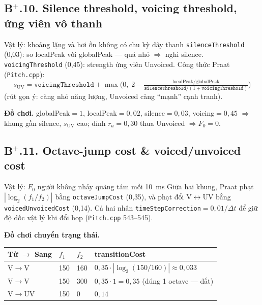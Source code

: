 \subsection*{B$^+$.10. Silence threshold, voicing threshold, ứng viên vô thanh}

\begin{firstprin}{Vật lý: khoảng lặng và hơi ồn không có chu kỳ dây thanh}
\texttt{silenceThreshold} (0{,}03): so localPeak với globalPeak --- quá nhỏ $\Rightarrow$ nghi silence. \texttt{voicingThreshold} (0{,}45): strength ứng viên Unvoiced. Công thức Praat (\texttt{Pitch.cpp}):
\[
s_{\mathrm{UV}} = \texttt{voicingThreshold} + \max\bigl(0,\; 2 - \tfrac{\mathrm{localPeak}/\mathrm{globalPeak}}{\texttt{silenceThreshold}/(1+\texttt{voicingThreshold})}\bigr)
\]
(rút gọn ý: càng nhỏ năng lượng, Unvoiced càng ``mạnh'' cạnh tranh).
\end{firstprin}

\noindent\textbf{Đồ chơi.} globalPeak$=1$, localPeak$=0{,}02$, silence$=0{,}03$, voicing$=0{,}45$ $\Rightarrow$ khung gần silence, $s_{\mathrm{UV}}$ cao; đỉnh $r_a=0{,}30$ thua Unvoiced $\Rightarrow F_0=0$.

\subsection*{B$^+$.11. Octave-jump cost \& voiced/unvoiced cost}

\begin{firstprin}{Vật lý: $F_0$ người không nhảy quãng tám mỗi 10~ms}
Giữa hai khung, Praat phạt $|\log_2(f_1/f_2)|$ bằng \texttt{octaveJumpCost} (0{,}35), và phạt đổi V$\leftrightarrow$UV bằng \texttt{voicedUnvoicedCost} (0{,}14). Cả hai nhân \texttt{timeStepCorrection}$=0{,}01/\Delta t$ để giữ độ dốc vật lý khi đổi hop (\texttt{Pitch.cpp} 543--545).
\end{firstprin}

\noindent\textbf{Đồ chơi chuyển trạng thái.}
\begin{center}\small
\begin{tabular}{@{}llll@{}}
\toprule
Từ $\to$ Sang & $f_1$ & $f_2$ & transitionCost \\
\midrule
V$\to$V & 150 & 160 & $0{,}35\cdot|\log_2(150/160)|\approx0{,}033$ \\
V$\to$V & 150 & 300 & $0{,}35\cdot1=0{,}35$ (đúng 1 octave --- đắt) \\
V$\to$UV & 150 & 0 & $0{,}14$ \\
\bottomrule
\end{tabular}
\end{center}

